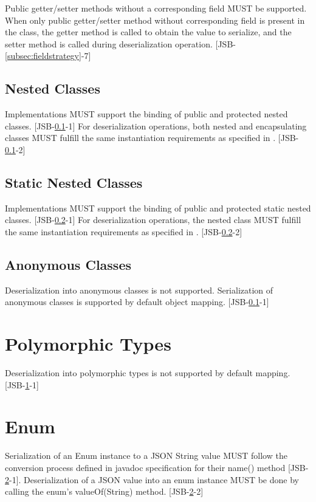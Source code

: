Public getter/setter methods without a corresponding field MUST be supported. 
When only public getter/setter method without corresponding field is present in the class, the getter method is called to obtain the value to serialize, and the setter method is called during deserialization operation. [JSB-\ref{subsec:fieldstrategy}-7]

\subsection{Nested Classes}
\label{subsec:nestedclass}
Implementations MUST support the binding of public and protected nested classes. [JSB-\ref{subsec:nestedclass}-1] 
For deserialization operations, both nested and encapsulating classes MUST fulfill the same instantiation requirements as specified in . [JSB-\ref{subsec:nestedclass}-2]

\subsection{Static Nested Classes}
\label{subsec:staticnested}
Implementations MUST support the binding of public and protected static nested classes. [JSB-\ref{subsec:staticnested}-1] 
For deserialization operations, the nested class MUST fulfill the same instantiation requirements as specified in . [JSB-\ref{subsec:staticnested}-2]

\subsection{Anonymous Classes}
\label{subsec:anonymous}
Deserialization into anonymous classes is not supported. Serialization of anonymous classes is supported by default object mapping. [JSB-\ref{subsec:nestedclass}-1]

\section{Polymorphic Types}
\label{sec:polymorph}
Deserialization into polymorphic types is not supported by default mapping. [JSB-\ref{sec:polymorph}-1]

\section{Enum}
\label{sec:enum}
Serialization of an Enum instance to a JSON String value 
MUST follow the conversion process defined in javadoc specification for their name() method [JSB-\ref{sec:enum}-1]. 
Deserialization of a JSON value into an enum instance MUST be done by calling the enum's valueOf(String) method. [JSB-\ref{sec:enum}-2]

